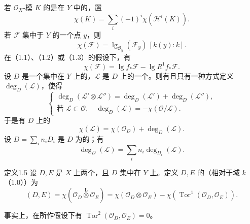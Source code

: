 若 $\mathcal O_X$-模 $K$ 的是在 $Y$ 中的，置
\begin{equation}\chi(K)=\sum_i(-1)^i\chi(\mathcal H^i(K)).\tag{1.4.2}\end{equation}
若 $\mathcal F$ 集中于 $Y$ 的一个点 $y$，则
\begin{equation}\chi(\mathcal F)=\operatorname{lg}_{\mathcal O_y}(\mathcal F_y)\,[k(y):k].\tag{1.4.3}\end{equation}
在（1.1）、（1.2）或（1.3）的假设下，有
\begin{equation}\chi(\mathcal F)=\operatorname{lg}f_*\mathcal F-\operatorname{lg}R^1f_*\mathcal F.\tag{1.4.4}\end{equation}
设 $D$ 是一个集中在 $Y$ 上的，$\mathcal L$ 是 $D$ 上的一个。则有且只有一种方式定义 $\deg_D(\mathcal L)$，使得
\begin{equation}
\begin{cases}
\deg_D(\mathcal L'\otimes\mathcal L'')=\deg_D(\mathcal L')+\deg_D(\mathcal L''),\\
\text{若 }\mathcal L\subset\mathcal O,\quad\deg_D(\mathcal L)=-\chi(\mathcal O/\mathcal L).
\end{cases}\tag{1.4.5}
\end{equation}
于是有 $D$ 上的 
\begin{equation}\chi(\mathcal L)=\chi(\mathcal O_D)+\deg_D(\mathcal L).\tag{1.4.6}\end{equation}
设 $D=\sum_i n_iD_i$ 是 $D$ 为的；有
\begin{equation}\deg_D(\mathcal L)=\sum_i n_i\deg_{D_i}(\mathcal L).\tag{1.4.7}\end{equation}
\begin{SGAresult}{定义}{1.5}
设 $D,E$ 是 $X$ 上两个，且 $D$ 集中在 $Y$ 上。定义 $D,E$ 的（相对于域 $k$（1.0））为
\[
(D,E)=\chi(\mathcal O_D\mathbin{\overset{\mathrm L}{\otimes}}\mathcal O_E)
=\chi(\mathcal O_D\otimes\mathcal O_E)-\chi(\operatorname{Tor}^1(\mathcal O_D,\mathcal O_E)).
\]
\end{SGAresult}
事实上，在所作假设下有 $\operatorname{Tor}^2(\mathcal O_D,\mathcal O_E)=0$。
